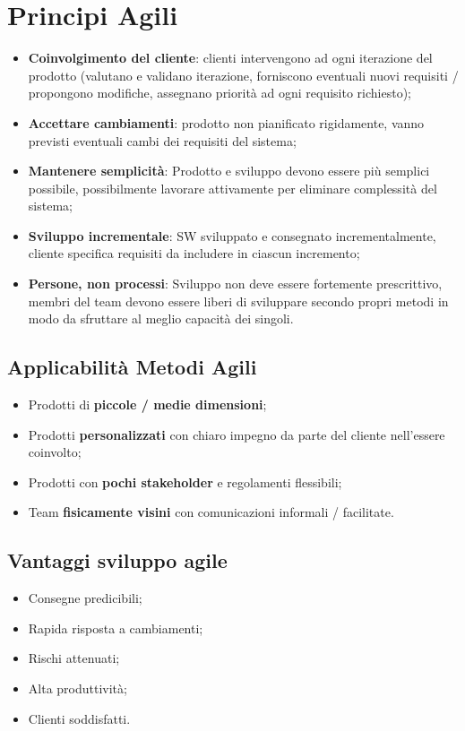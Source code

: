 \documentclass{article}
\begin{document}
  \section{Principi Agili}
    \begin{itemize}
      \item \textbf{Coinvolgimento del cliente}: clienti intervengono ad ogni iterazione del prodotto (valutano e validano iterazione, forniscono eventuali nuovi requisiti / propongono modifiche, assegnano priorità ad ogni requisito richiesto); 
      \item \textbf{Accettare cambiamenti}: prodotto non pianificato rigidamente, vanno previsti eventuali cambi dei requisiti del sistema;
      \item \textbf{Mantenere semplicità}: Prodotto e sviluppo devono essere più semplici possibile, possibilmente lavorare attivamente per eliminare complessità del sistema;
      \item \textbf{Sviluppo incrementale}: SW sviluppato e consegnato incrementalmente, cliente specifica requisiti da includere in ciascun incremento;
      \item \textbf{Persone, non processi}: Sviluppo non deve essere fortemente prescrittivo, membri del team devono essere liberi di sviluppare secondo propri metodi in modo da sfruttare al meglio capacità dei singoli.
    \end{itemize}
    \subsection{Applicabilità Metodi Agili}
      \begin{itemize}
        \item Prodotti di \textbf{piccole / medie dimensioni};
        \item Prodotti \textbf{personalizzati} con chiaro impegno da parte del cliente nell'essere coinvolto;
        \item Prodotti con \textbf{pochi stakeholder} e regolamenti flessibili;
        \item Team \textbf{fisicamente visini} con comunicazioni informali / facilitate.
      \end{itemize}
    \subsection{Vantaggi sviluppo agile}
      \begin{itemize}
        \item Consegne predicibili;
        \item Rapida risposta a cambiamenti;
        \item Rischi attenuati;
        \item Alta produttività; 
        \item Clienti soddisfatti.
      \end{itemize}
\end{document}
